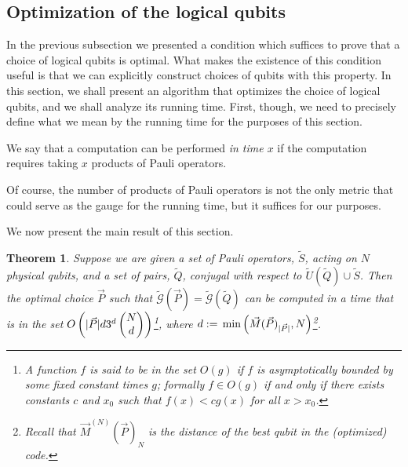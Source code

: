\documentclass[twocolumn,showpacs,preprintnumbers,amsmath,amssymb,nofootinbib,pra,floatfix]{revtex4-1}
\newtheorem{theorem}{Theorem}
\newenvironment{definition}[1][Definition]{\begin{trivlist}
\item[\hskip \labelsep {\bfseries #1}]}{\end{trivlist}}
\newcommand{\lst}{\vec}
\newcommand{\set}{\tilde}
\newcommand{\genfun}{\tilde{\mathcal{G}}}
\begin{document}
\subsection{Optimization of the logical qubits}

\label{optimization}

In the previous subsection we presented a condition which suffices to prove that a choice of logical qubits is optimal.  What makes the existence of this condition useful is that we can explicitly construct choices of qubits with this property.  In this section, we shall present an algorithm that optimizes the choice of logical qubits, and we shall analyze its running time.  First, though, we need to precisely define what we mean by the running time for the purposes of this section.

\begin{definition}
We say that a computation can be performed \emph{in time $x$} if the computation requires taking $x$ products of Pauli operators.
\end{definition}

Of course, the number of products of Pauli operators is not the only metric that could serve as the gauge for the running time, but it suffices for our purposes.

We now present the main result of this section.

\begin{theorem}
\label{theorem:optimization procedure}
Suppose we are given a set of Pauli operators, $\set S$, acting on $N$ physical qubits, and a set of pairs, $\set Q$, conjugal with respect to $\set U(\set Q)\cup\set S$.  Then the optimal choice $\lst P$ such that $\genfun(\lst P)=\genfun(\set Q)$ can be computed in a time that is in the set $O\paren{|\lst P|d3^d\choose{N}{d}}$\footnote{A function $f$ is said to be in the set $O(g)$ if $f$ is asymptotically bounded by some fixed constant times $g$;  formally $f\in O(g)$ if and only if there exists constants $c$ and $x_0$ such that $f(x)<c g(x)$ for all $x>x_0$.}, where $d:=\min\paren{\lst M(\lst P)_{|\lst P|},N}$\footnote{Recall that $\lst M^{(N)}(\lst P)_N$ is the distance of the best qubit in the (optimized) code.}.
\end{theorem}
\end{document}
